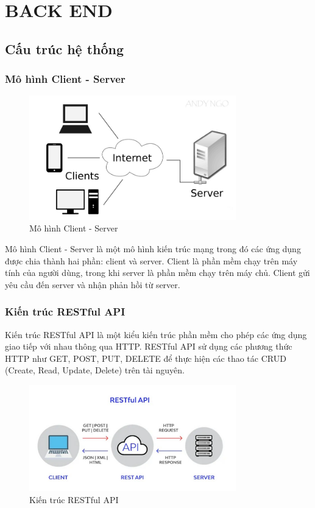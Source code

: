 \chapter{BACK END}
    \section{Cấu trúc hệ thống}
        \subsection{Mô hình Client - Server}
            \begin{figure}[H]
                \centering
                \includegraphics[width=0.8\textwidth]{pictures/ServerClient.png}
                \caption{Mô hình Client - Server}
                \label{fig:client-server}
            \end{figure}
            \hspace*{0.6cm}Mô hình Client - Server là một mô hình kiến trúc mạng trong đó các ứng dụng được chia thành hai phần: client và server. Client là phần mềm chạy trên máy tính của người dùng, trong khi server là phần mềm chạy trên máy chủ. Client gửi yêu cầu đến server và nhận phản hồi từ server.
        \subsection{Kiến trúc RESTful API}
            \hspace*{0.6cm}Kiến trúc RESTful API là một kiểu kiến trúc phần mềm cho phép các ứng dụng giao tiếp với nhau thông qua HTTP. RESTful API sử dụng các phương thức HTTP như GET, POST, PUT, DELETE để thực hiện các thao tác CRUD (Create, Read, Update, Delete) trên tài nguyên.
            \begin{figure}[H]
                \centering
                \includegraphics[width=0.8\textwidth]{pictures/RESTfulAPI.png}
                \caption{Kiến trúc RESTful API}
                \label{fig:restful-api}
            \end{figure}
